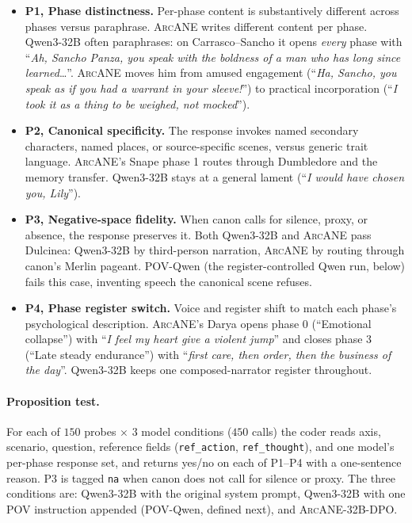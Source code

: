 \documentclass{llmxive}
\providecommand{\ours}{\textsc{ArcANE}}
\begin{document}
\begin{itemize}
\setlength{\itemsep}{1pt}
\item \textbf{P1, Phase distinctness.} Per-phase content is substantively different across phases versus paraphrase. \ours{} writes different content per phase. Qwen3-32B often paraphrases: on Carrasco--Sancho it opens \emph{every} phase with ``\emph{Ah, Sancho Panza, you speak with the boldness of a man who has long since learned}\ldots''. \ours{} moves him from amused engagement (``\emph{Ha, Sancho, you speak as if you had a warrant in your sleeve!}'') to practical incorporation (``\emph{I took it as a thing to be weighed, not mocked}'').
\item \textbf{P2, Canonical specificity.} The response invokes named secondary characters, named places, or source-specific scenes, versus generic trait language. \ours{}'s Snape phase 1 routes through Dumbledore and the memory transfer. Qwen3-32B stays at a general lament (``\emph{I would have chosen you, Lily}'').
\item \textbf{P3, Negative-space fidelity.} When canon calls for silence, proxy, or absence, the response preserves it. Both Qwen3-32B and \ours{} pass Dulcinea: Qwen3-32B by third-person narration, \ours{} by routing through canon's Merlin pageant. POV-Qwen (the register-controlled Qwen run, below) fails this case, inventing speech the canonical scene refuses.
\item \textbf{P4, Phase register switch.} Voice and register shift to match each phase's psychological description. \ours{}'s Darya opens phase 0 (``Emotional collapse'') with ``\emph{I feel my heart give a violent jump}'' and closes phase 3 (``Late steady endurance'') with ``\emph{first care, then order, then the business of the day}''. Qwen3-32B keeps one composed-narrator register throughout.
\end{itemize}

\paragraph{Proposition test.}
For each of $150$ probes $\times$ $3$ model conditions ($450$ calls) the coder reads axis, scenario, question, reference fields (\texttt{ref\_action}, \texttt{ref\_thought}), and one model's per-phase response set, and returns yes/no on each of P1--P4 with a one-sentence reason. P3 is tagged \texttt{na} when canon does not call for silence or proxy. The three conditions are: Qwen3-32B with the original system prompt, Qwen3-32B with one POV instruction appended (POV-Qwen, defined next), and \ours{}-32B-DPO.
\end{document}
